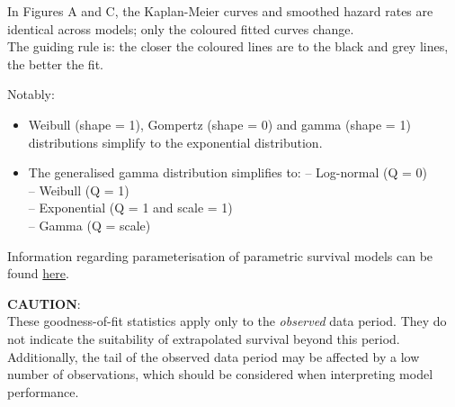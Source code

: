 \documentclass[
]{article}
\providecommand{\tightlist}{%
  \setlength{\itemsep}{0pt}\setlength{\parskip}{0pt}}
\begin{document}
In Figures A and C, the Kaplan-Meier curves and smoothed hazard rates
are identical across models; only the coloured fitted curves change.\\
The guiding rule is: the closer the coloured lines are to the black and
grey lines, the better the fit.

Notably:

\begin{itemize}
\tightlist
\item
  Weibull (shape = 1), Gompertz (shape = 0) and gamma (shape = 1)
  distributions simplify to the exponential distribution.\\
\item
  The generalised gamma distribution simplifies to: -- Log-normal (Q =
  0)\\
  -- Weibull (Q = 1)\\
  -- Exponential (Q = 1 and scale = 1)\\
  -- Gamma (Q = scale)
\end{itemize}

Information regarding parameterisation of parametric survival models can
be found
\href{https://devinincerti.com/code/survival-distributions.html}{here}.

\textbf{CAUTION}:\\
These goodness-of-fit statistics apply only to the \emph{observed} data
period. They do not indicate the suitability of extrapolated survival
beyond this period. Additionally, the tail of the observed data period
may be affected by a low number of observations, which should be
considered when interpreting model performance.

\clearpage

\begin{table}[H]
\centering
\caption{\label{tab:Table_2}Goodness of fit statistics}
\centering
{}
\end{table}
\end{document}
